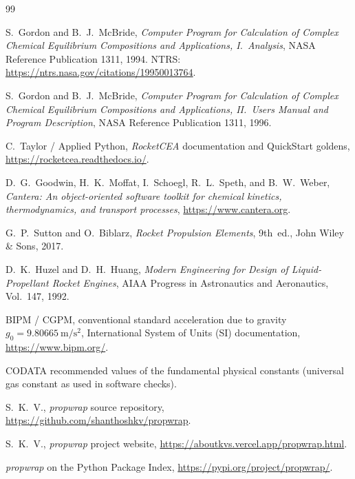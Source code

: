 \documentclass[11pt,a4paper]{report}
\newcommand{\gzero}{g_{0}}
\begin{document}
\begin{thebibliography}{99}

S.~Gordon and B.~J.~McBride,
\emph{Computer Program for Calculation of Complex Chemical Equilibrium
Compositions and Applications, I.~Analysis},
NASA Reference Publication 1311, 1994.
NTRS: \url{https://ntrs.nasa.gov/citations/19950013764}.

S.~Gordon and B.~J.~McBride,
\emph{Computer Program for Calculation of Complex Chemical Equilibrium
Compositions and Applications, II.~Users Manual and Program Description},
NASA Reference Publication 1311, 1996.

C.~Taylor / Applied Python,
\emph{RocketCEA} documentation and QuickStart goldens,
\url{https://rocketcea.readthedocs.io/}.

D.~G.~Goodwin, H.~K.~Moffat, I.~Schoegl, R.~L.~Speth, and B.~W.~Weber,
\emph{Cantera: An object-oriented software toolkit for chemical kinetics,
thermodynamics, and transport processes},
\url{https://www.cantera.org}.

G.~P.~Sutton and O.~Biblarz,
\emph{Rocket Propulsion Elements}, 9th~ed.,
John Wiley \& Sons, 2017.

D.~K.~Huzel and D.~H.~Huang,
\emph{Modern Engineering for Design of Liquid-Propellant Rocket Engines},
AIAA Progress in Astronautics and Aeronautics, Vol.~147, 1992.

BIPM / CGPM,
conventional standard acceleration due to gravity
$\gzero=\SI{9.80665}{\metre\per\second\squared}$,
International System of Units (SI) documentation,
\url{https://www.bipm.org/}.

CODATA recommended values of the fundamental physical constants
(universal gas constant as used in software checks).

S.~K.~V.,
\emph{propwrap} source repository,
\url{https://github.com/shanthoshkv/propwrap}.

S.~K.~V.,
\emph{propwrap} project website,
\url{https://aboutkvs.vercel.app/propwrap.html}.

\emph{propwrap} on the Python Package Index,
\url{https://pypi.org/project/propwrap/}.

\end{thebibliography}
\end{document}
